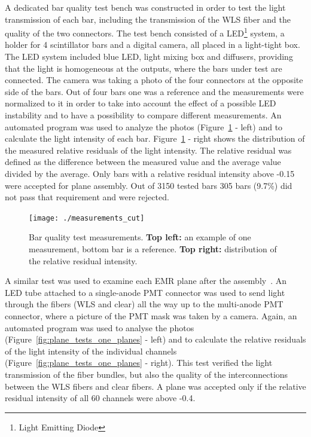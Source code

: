 \documentclass[a4paper,11pt]{article}
\begin{document}
A dedicated bar quality test bench was constructed in order to test the light transmission of each bar, including the transmission of the WLS fiber and the
quality of the two connectors. The test bench consisted of a LED\footnote{Light Emitting Diode} system, a holder for 4 scintillator bars and a digital camera,
all placed in a light-tight box. The LED system included blue LED, light mixing box and diffusers, providing that the light is homogeneous at the outputs,
where the bars under test are connected. The camera was taking a photo of the four connectors at the opposite side of the bars. Out of four bars one was a
reference and the measurements were normalized to it in order to take into account the effect of a possible LED instability and to have a possibility to
compare different measurements. An automated program was used to analyze the photos (Figure~\ref{fig:measurements} - left) and to calculate the light
intensity of each bar. Figure~\ref{fig:measurements} - right shows the distribution of the measured relative residuals of the light intensity. The relative
residual was defined as the difference between the measured value and the average value divided by the average. Only bars with a relative residual
intensity above -0.15 were accepted for plane assembly. Out of 3150 tested bars 305 bars (9.7\%) did not pass that requirement and were rejected.

\begin{figure}[htb]
 \centering
 \texttt{[image: ./measurements\_cut]}
 \caption[Bar quality test measurements]{Bar quality test measurements. {\bf Top left:} an example of one measurement, bottom bar is a reference. {\bf Top
 right:} distribution of the relative residual intensity.}
 \label{fig:measurements}
\end{figure}

A similar test was used to examine each EMR plane after the assembly~\cite{emr_elquality}. An LED tube attached to a single-anode PMT connector was used
to send light through the fibers (WLS and clear) all the way up to the multi-anode PMT connector, where a picture of the PMT mask was taken by a camera.
Again,  an automated program was used to analyse the photos (Figure~\ref{fig:plane_tests_one_planes} - left) and to calculate the relative residuals of
the light intensity of the individual channels (Figure~\ref{fig:plane_tests_one_planes} - right). This test verified the light transmission of the fiber
bundles, but also the quality of the interconnections between the WLS fibers and clear fibers. A plane was accepted only if the relative residual intensity
of all 60 channels were above -0.4.
\end{document}
